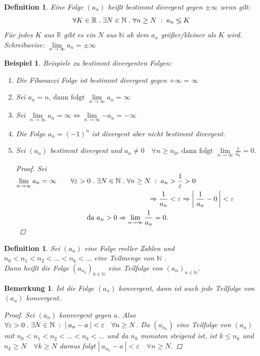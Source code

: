 \documentclass[a4paper,titlepage,oneside]{article}
\def\N{\ensuremath{\mathbb{N}} }
\def\R{\ensuremath{\mathbb{R}} }
\renewcommand{\epsilon}{\ensuremath{\varepsilon} }
\def\sp{\hspace{0,1cm}}
\def\spdot{\sp.\sp}
\def\spcolon{\sp:\sp}
\renewcommand{\liminf}[2][n]{\ensuremath{\lim\limits_{#1 \rightarrow \infty}{#2}}}
\newcommand{\abs}[1]{\ensuremath{\left|\:#1\:\right|}}
\theoremstyle{thmstyle}
\newtheorem{defi}[satz]{Definition}
\newtheorem{bsp}[satz]{Beispiel}
\newtheorem{bem}[satz]{Bemerkung}
\theoremstyle{subthmstyle}
\begin{document}
\begin{defi}
Eine Folge \((a_n)\) heißt bestimmt divergent gegen \(\pm \infty \) wenn gilt:
\[\forall K \in \R \spdot \exists N \in \N \spdot \forall n \ge N \spcolon  a_n \lessgtr K \]
Für jedes $K$ aus \R  gibt es ein $N$ aus \N ab dem $a_n$ größer/kleiner als $K$ wird. Schreibweise: \(\liminf{a_n} = \pm \infty \)
\end{defi}

\begin{bsp}
Beispiele zu bestimmt divergenten Folgen:
\begin{enumerate}
\item Die Fibonacci Folge ist bestimmt divergent gegen \(+ \infty = \infty \)
\item Sei \(a_n = n\text{, dann folgt }\liminf{a_n} = \infty\)
\item Sei \(\liminf{a_n} = \infty \Leftrightarrow \liminf{-a_n} = - \infty\)
\item Die Folge \(a_n = (-1)^n\) ist divergent aber nicht bestimmt divergent.
\item Sei \((a_n)\) bestimmt divergent und $ \displaystyle a_n \ne 0 \quad \forall n \ge n_0\text{, dann folgt }\liminf{\frac{1}{a_n}} = 0$.
\begin{proof}Sei $ \displaystyle \liminf{a_n} = \infty \quad
\begin{aligned}[t] &&\forall \epsilon > 0 \spdot \exists N \in \N \spdot \forall n \ge N \spcolon a_n &> \frac{1}{\epsilon} > 0 \\
&&\Rightarrow \frac{1}{a_n} &< \epsilon \Rightarrow \abs{\frac{1}{a_n} - 0} < \epsilon  \\
&&\text{da } a_n > 0 \Rightarrow \liminf{\frac{1}{a_n}} = 0.
\end{aligned}$\\
\end{proof}
\end{enumerate}
\end{bsp}

\begin{defi}
Sei \((a_n)\) eine Folge reeller Zahlen und \(n_0 < n_1 < n_2 < \dots < n_k < \dots \) eine Teilmenge von \N.\\
Dann heißt die Folge \((a_{n_k})_{k \in \N }\) eine Teilfolge von \((a_n)_{n \in \N}\).
\end{defi}

\begin{bem}
Ist die Folge \((a_n)\) konvergent, dann ist auch jede Teilfolge von \((a_n)\) konvergent.
\begin{proof} Sei $(a_n)$ konvergent gegen $a$. Also $ \forall \epsilon > 0 \spdot \exists N \in \N \spcolon \abs{a_n - a} < \epsilon \quad \forall n \ge N$. Da $(a_{n_k})$ eine Teilfolge von $(a_n)$ mit $n_0 < n_1 < n_2 < \dots < n_k < \dots$ und da $n_k$ monoton steigend ist, ist $k \le n_k$ und $n_k \ge N \quad \forall k \ge N $ daraus folgt $\abs{a_{n_k} - a} < \epsilon \quad \forall n \ge N$.
\end{proof}
\end{bem}
\end{document}

